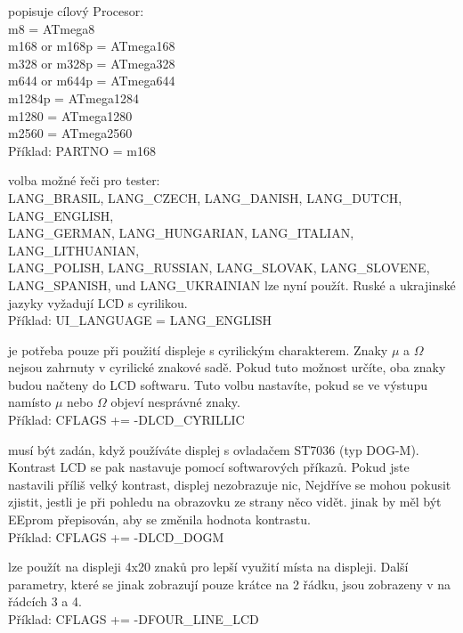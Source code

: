 \begin{description} \setlength{\itemsep}{0em}
  \item[PARTNO] popisuje cílový Procesor:\\
         m8 = ATmega8\\
         m168 or m168p = ATmega168\\
         m328 or m328p = ATmega328\\
         m644 or m644p = ATmega644\\
         m1284p        = ATmega1284\\
         m1280         = ATmega1280\\
         m2560         = ATmega2560\\
    Příklad: PARTNO = m168
  \item[UI\_LANGUAGE] volba možné řeči pro tester:\\
    LANG\_BRASIL, LANG\_CZECH, LANG\_DANISH, LANG\_DUTCH, LANG\_ENGLISH, \\
    LANG\_GERMAN, LANG\_HUNGARIAN, LANG\_ITALIAN, LANG\_LITHUANIAN, \\
    LANG\_POLISH, LANG\_RUSSIAN, LANG\_SLOVAK, LANG\_SLOVENE, \\
    LANG\_SPANISH, und LANG\_UKRAINIAN lze nyní použít.
 Ruské a ukrajinské jazyky vyžadují LCD s cyrilikou.\\
    Příklad: UI\_LANGUAGE = LANG\_ENGLISH
  \item[LCD\_CYRILLIC] je potřeba pouze při použití displeje s cyrilickým charakterem.
Znaky \(\mu\) a \(\Omega\) nejsou zahrnuty v cyrilické znakové sadě.
Pokud tuto možnost určíte, oba znaky budou načteny do LCD softwaru.
Tuto volbu nastavíte, pokud se ve výstupu namísto \(\mu\) nebo \(\Omega\) objeví nesprávné znaky.\\
Příklad: CFLAGS += -DLCD\_CYRILLIC
  \item[LCD\_DOGM] musí být zadán, když používáte displej s ovladačem ST7036 (typ DOG-M).
Kontrast LCD se pak nastavuje pomocí softwarových příkazů.
Pokud jste nastavili příliš velký kontrast, displej nezobrazuje nic,
Nejdříve se mohou pokusit zjistit, jestli je při pohledu na obrazovku ze strany něco vidět.
jinak by měl být EEprom přepisován, aby se změnila hodnota kontrastu.\\
Příklad: CFLAGS += -DLCD\_DOGM
  \item[FOUR\_LINE\_LCD] lze použít na displeji 4x20 znaků pro lepší využití místa na displeji.
Další parametry, které se jinak zobrazují pouze krátce na 2 řádku, jsou zobrazeny v na řádcích 3 a 4.\\
Příklad: CFLAGS += -DFOUR\_LINE\_LCD


\end{description}
